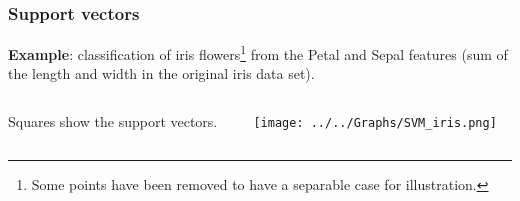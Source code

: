 \begin{frame}
\frametitle{Support vectors}
{\bf Example}: classification of iris flowers\footnote{Some points have been removed to have a separable case for illustration.} from the Petal and Sepal features (sum of the length and width in the original iris data set). 
\begin{columns}
\begin{column}{0.4\textwidth}
\vspace{-2cm}

Squares show the support vectors.
\end{column}
\begin{column}{0.6\textwidth}
\texttt{[image: ../../Graphs/SVM\_iris.png]} 
\end{column}
\end{columns}
\end{frame}
